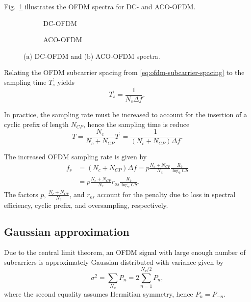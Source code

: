 \documentclass[a4paper]{article}
\begin{document}
Fig.~\ref{fig:ofdm-spectra} illustrates the OFDM spectra for DC- and ACO-OFDM.

\FloatBarrier
\begin{figure}[h!]
	\centering
	\begin{subfigure}[h!]{\textwidth}
		\centering
		\resizebox{\linewidth}{!}{}
		\caption{DC-OFDM}
	\end{subfigure}%
	
	\begin{subfigure}[h!]{\textwidth}
		\centering
		\resizebox{\linewidth}{!}{}
		\caption{ACO-OFDM}
	\end{subfigure}
	\caption{(a) DC-OFDM and (b) ACO-OFDM spectra.} \label{fig:ofdm-spectra}
\end{figure}
\FloatBarrier

Relating the OFDM subcarrier spacing from \eqref{eq:ofdm-subcarrier-spacing} to the sampling time $T_s^{\prime}$ yields
\begin{equation}
T_s^{\prime} = \frac{1}{N_c\Delta f},
\end{equation}

In practice, the sampling rate must be increased to account for the insertion of a cyclic prefix of length $N_{CP}$, hence the sampling time is reduce
\begin{equation}
T = \frac{N_c}{N_c + N_{CP}}T^{\prime} = \frac{1}{(N_c + N_{CP})\Delta f}.
\end{equation}

The increased OFDM sampling rate is given by
\begin{align} \nonumber
f_s &= (N_c + N_{CP})\Delta f = p\frac{N_c + N_{CP}}{N_u}\frac{R_b}{\log_2 CS} \\
&= p\frac{N_c + N_{CP}}{N_c}r_{os}\frac{R_b}{\log_2 CS}.
\end{align}
The factors $p$, $\frac{N_c + N_{CP}}{N_c}$, and $r_{os}$ account for the penalty due to loss in spectral efficiency, cyclic prefix, and oversampling, respectively. 

\subsection{Gaussian approximation}

Due to the central limit theorem, an OFDM signal with large enough number of subcarriers is approximately Gaussian distributed with variance given by
\begin{equation}
\sigma^2 = \sum_{N_u} P_n = 2\sum_{n=1}^{N_u/2} P_n,
\end{equation}
where the second equality assumes Hermitian symmetry, hence $P_n = P_{-n}$. 
\end{document}
